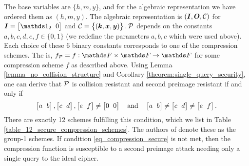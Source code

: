 \begin{pchstack}[center,space=2cm]
\end{pchstack}
The base variables are $\{h, m, y\}$, and for the algebraic representation we have ordered them as $(h, m, y)$.
The algebraic representation is $(\I, \O, \C)$ for $\I = \m{\Id_2 & 0}$ and $\C = \big\{(\vk, \vx, \vy) \big\}$.
$\P$ depends on the constants $a,b,c,d,e,f \in \{0,1\}$ (we redefine the parameters $a,b,c$ which were used above).
Each choice of these 6 binary constants corresponds to one of the compression schemes.
The is, $f_\P = f:\F \times \F \to \F$ for some compression scheme $f$ as described above.
% 
Using Lemma \ref{lemma_no_collision_structure} and Corollary \ref{theorem:single_query_security},
one can derive that $\P$ is collision resistant and second preimage resistant if and only if
\begin{equation}
\label{eq_compression_secure}
    \m{a&b}, \m{c&d}, \m{e&f} \neq \m{0&0} \quad \textrm{and}\quad \m{a&b} \neq\m{c&d} \neq \m{e&f}.
\end{equation}
There are exactly 12 schemes fulfilling this condition,
which we list in Table \ref{table_12_secure_compression_schemes}.
The authors of \cite{C:BlaRogShr02} denote these as the group-1 schemes.
If condition \eqref{eq_compression_secure} is not met,
then the compression function is susceptible to a second preimage attack needing only a single query to the ideal cipher.

